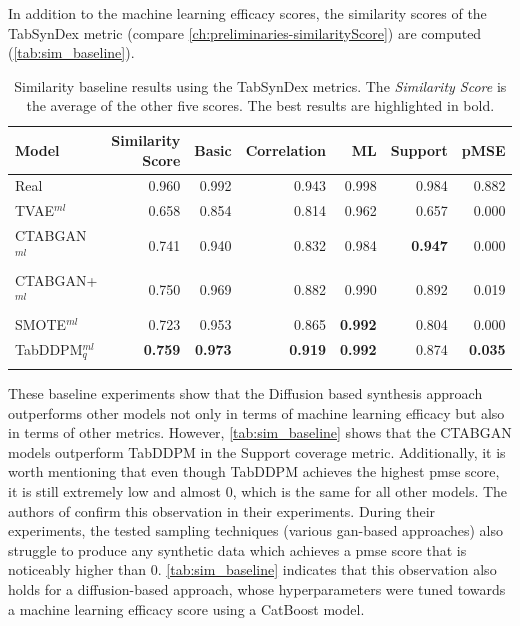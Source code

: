 In addition to the machine learning efficacy scores, the similarity scores of the TabSynDex metric (compare \autoref{ch:preliminaries-similarityScore}) are computed (\autoref{tab:sim_baseline}).

\begin{table}[h]
	\centering
	\begin{tabular}{lrrrrrr}
		\toprule
		\textbf{Model}     & \textbf{Similarity Score} & \textbf{Basic} & \textbf{Correlation} & \textbf{ML}    & \textbf{Support} & \textbf{pMSE}  \\
		\midrule
		Real               & 0.960                     & 0.992          & 0.943                & 0.998          & 0.984            & 0.882          \\
		TVAE$^{ml}$        & 0.658                     & 0.854          & 0.814                & 0.962          & 0.657            & 0.000          \\
		CTABGAN$^{ml}$     & 0.741                     & 0.940          & 0.832                & 0.984          & \textbf{0.947}   & 0.000          \\
		CTABGAN+$^{ml}$    & 0.750                     & 0.969          & 0.882                & 0.990          & 0.892            & 0.019          \\
		SMOTE$^{ml}$       & 0.723                     & 0.953          & 0.865                & \textbf{0.992} & 0.804            & 0.000          \\
		TabDDPM$^{ml}_{q}$ & \textbf{0.759}            & \textbf{0.973} & \textbf{0.919}       & \textbf{0.992} & 0.874            & \textbf{0.035} \\
		\bottomrule
		\multicolumn{7}{c}{}\\[-0.6em]
	\end{tabular}
	\caption[TabSynDex Baseline]{Similarity baseline results using the TabSynDex metrics. The \textit{Similarity Score} is the average of the other five scores. The best results are highlighted in bold.}
	\label{tab:sim_baseline}
\end{table}

These baseline experiments show that the Diffusion based synthesis approach outperforms other models not only in terms of machine learning efficacy but also in terms of other metrics.
However, \autoref{tab:sim_baseline} shows that the CTABGAN models outperform TabDDPM in the Support coverage metric.
Additionally, it is worth mentioning that even though TabDDPM achieves the highest \gls{pmse} score, it is still extremely low and almost 0, which is the same for all other models.
The authors of \cite{chundawat2022UniversalMetricRobust} confirm this observation in their experiments.
During their experiments, the tested sampling techniques (various \gls{gan}-based approaches) also struggle to produce any synthetic data which achieves a \gls{pmse} score that is noticeably higher than 0.
\autoref{tab:sim_baseline} indicates that this observation also holds for a diffusion-based approach, whose hyperparameters were tuned towards a machine learning efficacy score using a CatBoost model.

